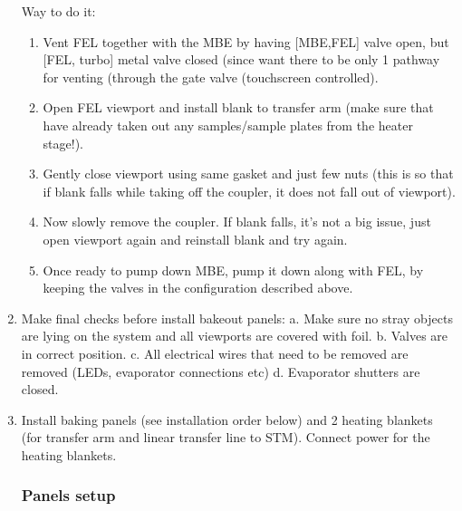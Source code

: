 \begin{enumerate}
Way to do it:
\begin{enumerate}
\item	Vent FEL together with the MBE by having [MBE,FEL] valve open, but [FEL, turbo] metal valve closed (since want there to be only 1 pathway for venting (through the gate valve (touchscreen controlled).  
\item	Open FEL viewport and install blank to transfer arm (make sure that have already taken out any samples/sample plates from the heater stage!). 
\item	Gently close viewport using same gasket and just few nuts (this is so that if blank falls while taking off the coupler, it does not fall out of viewport). 
\item	Now slowly remove the coupler. If blank falls, it’s not a big issue, just open viewport again and reinstall blank and try again.
\item	Once ready to pump down MBE, pump it down along with FEL, by keeping the valves in the configuration described above.
\end{enumerate}
\item	Make final checks before install bakeout panels: 
a.	Make sure no stray objects are lying on the system and all viewports are covered with foil.
b.	Valves are in correct position.
c.	All electrical wires that need to be removed are removed (LEDs, evaporator connections etc)
d.	Evaporator shutters are closed.
\item	Install baking panels (see installation order below) and 2 heating blankets (for transfer arm and linear transfer line to STM). Connect power for the heating blankets.
\subsubsection*{Panels setup}


\end{enumerate}
